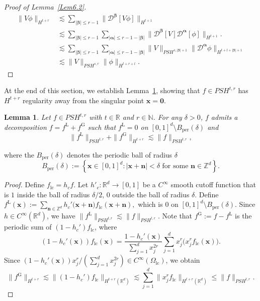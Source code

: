 \documentclass{sn-jnl}%
\newcommand{\nm}[1]{\| #1 \|}
\newcommand{\bnm}[1]{\bigl\| #1 \bigr\|}
\numberwithin{equation}{section}
\theoremstyle{thmstyleone}%
\newtheorem{lemma}{Lemma}[section]%
\theoremstyle{thmstyletwo}%
\theoremstyle{thmstylethree}%
\begin{document}
\begin{proof}[Proof of Lemma~\ref{Lem6.2}]
    \begin{equation}\label{eq-Lem6.2-08}
    \begin{aligned}
    \|V\phi\|_{H^{t+r}}
    &\lesssim
    \sum_{|\bm \beta|\leq r-1}\bigl\|\mathcal{D}^{\bm \beta}[V\phi]\bigr\|_{H^{t+1}}
    \\&\lesssim
    \sum_{|\bm \beta|\leq r-1}\sum_{|\bm \alpha|\leq r-1-|\bm \beta|}\bnm{\mathcal{D}^{\bm \beta}[V]\mathcal{D}^{\bm \alpha}[\phi]}_{H^{t+1}}.
    \\&\lesssim
    \sum_{|\bm \beta|\leq r-1}\sum_{|\bm \alpha|\leq r-1-|\bm \beta|}
    \nm{V}_{PSH^{s,|\bm \beta|+1}}\bnm{\mathcal{D}^{\bm \alpha}\phi}_{H^{t+l+|\bm \beta|+1}}
    \\&\lesssim
    \nm{V}_{PSH^{s,r}}\nm{\phi}_{H^{t+r+l}}.
    \end{aligned}
    \end{equation}  
\end{proof}

At the end of this section, we establish Lemma~\ref{Lem6.4}, showing that $f\in PSH^{t,r}$ has $H^{t+r}$ regularity away from the singular point $\bm x=\bm 0$.


\begin{lemma}\label{Lem6.4} Let $f\in PSH^{t,r}$ with $t\in \mathbb{R}$ and $r\in \mathbb{N}$. For any $\delta>0$, $f$ admits a decomposition $f= f^{\mathrm{L}}+f^{\mathrm{G}}$ such that $f^{\mathrm{L}}=0$ on $[0,1]^{d}\setminus B_{\mathrm{per}}(\delta)$ and
    \begin{equation}
    \|f^{\mathrm{L}}\|_{PSH^{t,r}}
    +\|f^{\mathrm{G}}\|_{H^{t+r}}
    \lesssim \| f \|_{PSH^{t,r}},
    \end{equation}
\end{lemma}
where the $B_{\mathrm{per}}(\delta)$ denotes the periodic ball of radius $\delta$
\[
B_{\mathrm{per}}(\delta)
:=
\left\{
\bm x\in [0,1]^d :
|\bm x+\bm n|<\delta
\text{ for some }
\bm n\in\mathbb Z^d
\right\}.
\]

\begin{proof}
  Define $f_{\mathrm{lc}} = h_cf$. Let $h'_c: \mathbb{R}^d \rightarrow [0,1]$ be a $C^\infty$ smooth cutoff function that is $1$ inside the ball of radius $\delta/2$, $0$ outside the ball of radius $\delta$. Define
$
f^{\mathrm{L}}(\bm x):= \sum_{\bm n \in \mathbb{Z}^d} h_c'\bigl(\bm x+\bm n\bigr)f_{\mathrm{lc}}(\bm x+\bm n),
$
which is 0 on $[0,1]^{d}\setminus B_{\mathrm{per}}(\delta)$. Since $h\in C^{\infty}(\mathbb{R}^d)$, we have $ \|f^{\mathrm{L}}\|_{PSH^{t,r}}\lesssim \| f\|_{PSH^{t,r}}$. Note that $f^{\mathrm{G}}:=f-f^{\mathrm{L}}$ is the periodic sum of $(1-h_c')f_{\mathrm{lc}}$, where
\[
(1-h_c'(\bm x))f_{\mathrm{lc}}(\bm x) = \frac{1-h_c'(\bm x)}{\sum_{j=1}^dx_{j}^{2r}}\sum_{j=1}^{d}x_j^{r}\bigl( x_j^{r} f_{\mathrm{lc}}(\bm x)\bigr).
\]
Since $(1-h_c'(\bm x))x_j^r/(\sum_{j=1}^{d} x_j^{2r}) \in C^{\infty}(\Omega_{\mathrm{lc}})$, we obtain
\begin{equation*}
\| f^{\mathrm{G}}\|_{H^{t+r}}
\lesssim \|(1-h_c')f_{\mathrm{lc}}\|_{H^{t+r}(\mathbb{R}^d)} 
\lesssim \sum_{j=1}^{d} \bigl\|x_j^rf_{\mathrm{lc}}\bigr\|_{H^{t+r}(\mathbb{R}^d)} \leq \| f\|_{PSH^{t,r}}.
\end{equation*}
\end{proof}
\end{document}
